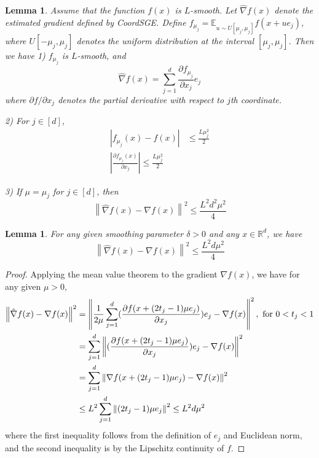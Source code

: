 \documentclass{article}
\newcommand*{\R}{\mathbb{R}}
\newcommand*{\E}{\mathbb{E}}
\newcommand{\norm}[1]{\left\lVert#1\right\rVert}
\newcommand{\abs}[1]{\left|#1\right|}
\newtheorem{lemma}[theorem]{Lemma}
\theoremstyle{definition}
\theoremstyle{remark}
\begin{document}
\begin{lemma}\label{CooSGE}
Assume that the function $f(x)$ is $L$-smooth. Let $\hat{\nabla} f(x)$ denote the estimated gradient defined by CoordSGE. Define $f_{\mu_j} = \E_{u\sim U[\mu_j, \mu_j]} f(x+ue_j)$, where $U[-\mu_j,\mu_j]$ denotes the uniform distribution at the interval $[\mu_j, \mu_j]$. Then we have 
1) $f_{\mu_j}$ is $L$-smooth, and 
\begin{equation}
\hat{\nabla} f(x) = \sum_{j=1}^d \frac{\partial f_{\mu_j}}{\partial x_j}e_j
\end{equation} 
where $\partial f/\partial x_j$ denotes the partial derivative with respect to $j$th coordinate.

2) For $j\in [d]$, 
\begin{align}
\abs{f_{\mu_j}(x) - f(x)} &\leq \frac{L\mu_j^2}{2}\\
\abs{\frac{\partial f_{\mu_j}(x)}{\partial x_j}} \leq \frac{L\mu_j^2}{2}
\end{align}
 
 3) If $\mu = \mu_j$ for $j\in [d]$, then 
 \begin{equation}
 \norm{\hat{\nabla} f(x) - {\nabla} f(x)} ^2 \leq \frac{L^2 d^2 \mu^2}{4}
\end{equation}  
\end{lemma}
{\color{Melon}
\begin{lemma}
For any given smoothing parameter $\delta > 0$ and any $x \in\R^d$, we have 
 \begin{equation}
 \norm{\hat{\nabla} f(x) - {\nabla} f(x)} ^2 \leq \frac{L^2 d \mu^2}{4}
\end{equation}
\end{lemma}
\begin{proof}
Applying the mean value theorem to the gradient $\nabla f(x)$, we have for any given $\mu > 0$,
 \begin{equation}
 \begin{split}
 \norm{\hat{\nabla} f(x) - {\nabla} f(x)} ^2 &= \norm{\frac{1}{2\mu}\sum_{j=1}^d(\frac{\partial f(x+(2t_j-1)\mu e_j)}{\partial x_j})e_j - \nabla f(x)}^2, \text{\,\,for $0 < t_j < 1$}\\
 & = \sum_{j=1}^d\norm{(\frac{\partial f(x+(2t_j-1)\mu e_j)}{\partial x_j})e_j - \nabla f(x)}^2\\
 & = \sum_{j=1}^d\norm{\nabla f(x+(2t_j-1)\mu e_j) - \nabla f(x)}^2\\
 &\leq L^2 \sum_{j=1}^d \norm{(2t_j-1)\mu e_j}^2 \leq L^2 d \mu^2
 \end{split}
\end{equation}
where the first inequality follows from the definition of $e_j$ and Euclidean norm, and the second inequality is by the Lipschitz continuity of $f$.
\end{proof}
}
\end{document}
